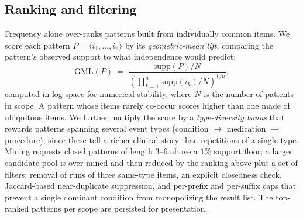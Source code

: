 \subsection{Ranking and filtering}
Frequency alone over-ranks patterns built from individually common items. We
score each pattern $P=\langle i_1,\dots,i_n\rangle$ by its \emph{geometric-mean
lift}, comparing the pattern's observed support to what independence would
predict:
\begin{equation}
  \mathrm{GML}(P) \;=\;
  \frac{\mathrm{supp}(P)/N}
       {\left(\prod_{k=1}^{n}\mathrm{supp}(i_k)/N\right)^{1/n}},
  \label{eq:gml}
\end{equation}
computed in log-space for numerical stability, where $N$ is the number of
patients in scope. A pattern whose items rarely co-occur scores higher than one
made of ubiquitous items. We further multiply the score by a
\emph{type-diversity bonus} that rewards patterns spanning several event types
(condition $\rightarrow$ medication $\rightarrow$ procedure), since these tell a
richer clinical story than repetitions of a single type. Mining requests closed
patterns of length 3--6 above a $1\%$ support floor; a larger candidate pool is
over-mined and then reduced by the ranking above plus a set of filters: removal
of runs of three same-type items, an explicit closedness check, Jaccard-based
near-duplicate suppression, and per-prefix and per-suffix caps that prevent a
single dominant condition from monopolizing the result list. The top-ranked
patterns per scope are persisted for presentation.
